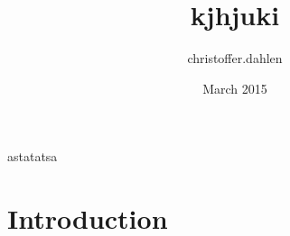 \documentclass{article}
\title{kjhjuki}
\author{christoffer.dahlen }
\date{March 2015}
\begin{document}
\maketitle
astatatsa
\section{Introduction}
\end{document}
